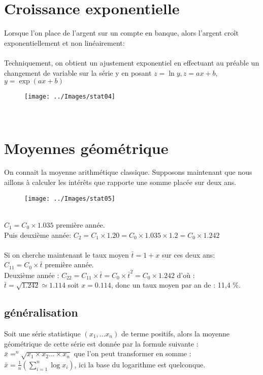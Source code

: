 \documentclass[a4paper]{report}
\begin{document}
    \section{Croissance exponentielle}
    Lorsque l'on place de l'argent sur un compte en banque, alors l'argent croît exponentiellement et non linéairement: \\ \\
    Techniquement, on obtient un ajustement exponentiel en effectuant au préable un changement de variable sur la série y en posant $z = \ln{y}, z = ax + b$, $y=\exp{(ax+b)}$ \\
    \begin{figure}[!h]
        \texttt{[image: ../Images/stat04]}
    \end{figure} \\

    \pagebreak
    \section{Moyennes géométrique}
    On connait la moyenne arithmétique classique. Supposons maintenant que nous aillons à calculer les intérêts que rapporte une somme placée sur deux ans.
    \begin{figure}[!h]
        \texttt{[image: ../Images/stat05]}
    \end{figure} \\

    $C_1 = C_0 \times 1.035$ première année.
    \\ Puis deuxième année: $C_2 = C_1 \times 1.20 = C_0 \times 1.035 \times 1.2 = C_0 \times 1.242  $
    \\ \\
    Si on cherche maintenant le taux moyen $\bar{t} = 1 + x$ sur ces deux ans: \\
    $C_{11} = C_0 \times \bar{t}$ première année. \\
    Deuxième année : $C_{22} = C_{11} \times \bar{t} = C_0 \times \bar{t}^2 = C_0 \times 1.242 $ d'où :\\
    $\bar{t} = \sqrt{1.242} \simeq 1.114$ soit $x=0.114$, donc un taux moyen par an de : 11,4 \%.

    \subsection{généralisation}
    Soit une série statistique $(x_1,...x_n)$ de terme positifs, alors la moyenne géométrique de cette série est donnée par la formule suivante :
    \\
    $\bar{x} = ^n\sqrt{x_1 \times x_2 ... \times x_n}$ que l'on peut transformer en somme : $\bar{x} = \frac{1}{n}(\sum_{i=1}^n \log{x_i})$, ici la base du logarithme est quelconque.

    
\end{document}
